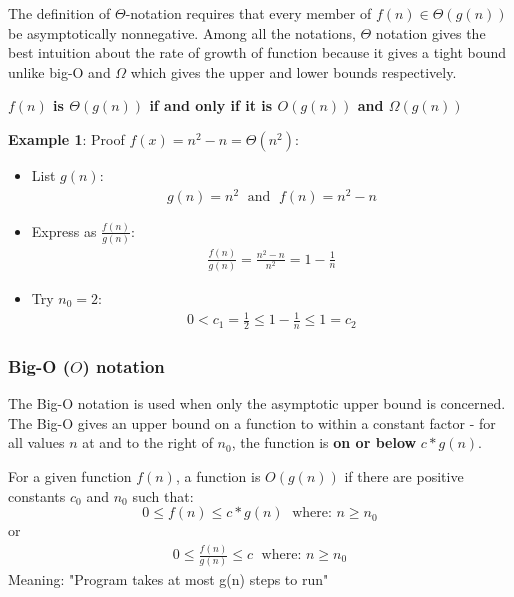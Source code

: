 \documentclass[10pt,a4paper]{article}
\begin{document}
The definition of $\Theta$-notation requires that every member of $f(n) \in \Theta(g(n))$ be
asymptotically nonnegative. Among all the notations, $\Theta$ notation gives the best intuition
about the rate of growth of function because it gives a tight bound unlike big-O and $\Omega$ which
gives the upper and lower bounds respectively. \par 

\begin{center}
    \textbf{$f(n)$ is $\Theta(g(n))$ if and only if it is $O(g(n))$ and $\Omega(g(n))$}
\end{center}

\textbf{Example 1}: Proof $f(x) = n^2 - n = \Theta(n^2)$:
\begin{itemize}
    \item List $g(n)$:
    \begin{align*}
        g(n) = n^2 \; \text{ and } \; f(n) = n^2 - n
    \end{align*} 

    \item Express as $\frac{f(n)}{g(n)}$:
    \begin{align*}
        \frac{f(n)}{g(n)} = \frac{n^2 - n}{n^2} = 1 - \frac{1}{n}
    \end{align*}

    \item Try $n_0 = 2$:
    \begin{align*}
        0 < c_1 = \frac{1}{2} \leq 1 - \frac{1}{n} \leq 1 = c_2
    \end{align*}
\end{itemize}

\pagebreak

\subsubsection{Big-O ($O$) notation}

The Big-O notation is used when only the asymptotic upper bound is concerned. The Big-O gives an
upper bound on a function to within a constant factor - for all values $n$ at and to the right of
$n_0$, the function is \textbf{on or below} $c*g(n)$.

\begin{tcolorbox}[breakable,colback=white]
For a given function $f(n)$, a function is $O(g(n))$ if there are positive constants $c_0$ and $n_0$ such that:
$$
0 \leq f(n) \leq c*g(n) \; \text{ where: $n\geq n_0$}
$$
or
\begin{align*}
    0 \leq \frac{f(n)}{g(n)} \leq c \; \text{ where: $n\geq n_0$}
\end{align*}
Meaning: "Program takes at most g(n) steps to run"
\end{tcolorbox}
\end{document}
